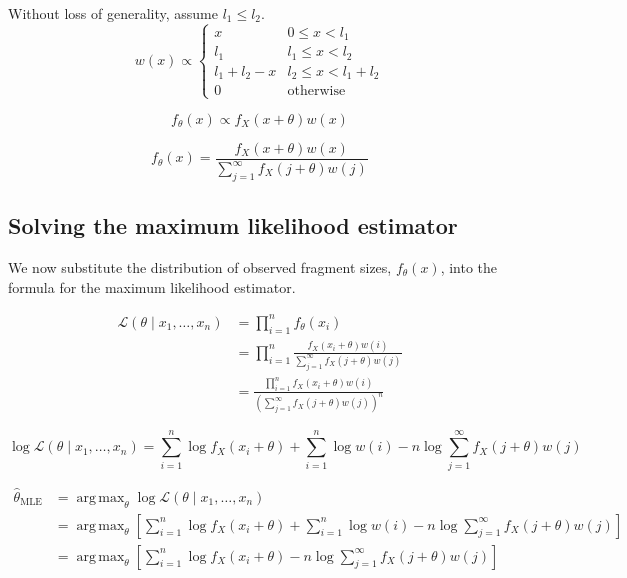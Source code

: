 \documentclass[letterpaper,12pt]{article}
\DeclareMathOperator*{\argmax}{arg\,max}
\DeclareMathOperator{\MLE}{MLE}
\begin{document}
Without loss of generality, assume $l_1 \leq l_2$.
\begin{equation*}
w(x) \propto \begin{cases}
x & 0 \leq x < l_1 \\
l_1 & l_1 \leq x < l_2 \\
l_1 + l_2 - x & l_2 \leq x < l_1 + l_2 \\
0 & \text{otherwise}
\end{cases}
\end{equation*}

\begin{equation*}
f_\theta(x) \propto f_X(x + \theta) w(x)
\end{equation*}

\begin{equation*}
f_\theta(x) = \frac{ f_X(x + \theta) w(x) }
	{ \sum_{j=1}^\infty f_X(j + \theta) w(j) }
\end{equation*}

\subsection*{Solving the maximum likelihood estimator}

We now substitute the distribution of observed fragment sizes,
$f_\theta(x)$, into the formula for the maximum likelihood estimator.

\begin{align*}
\mathcal{L}(\theta \mid x_1, \dotsc, x_n)
&= \prod_{i=1}^n f_\theta(x_i) \\
&= \prod_{i=1}^n \frac{ f_X(x_i + \theta) w(i) }
	{ \sum_{j=1}^\infty f_X(j + \theta) w(j) } \\
&= \frac{ \prod_{i=1}^n f_X(x_i + \theta) w(i) }
	{ \left( \sum_{j=1}^\infty f_X(j + \theta) w(j) \right) ^n }
\end{align*}

\begin{equation*}
\log \mathcal{L}(\theta \mid x_1, \dotsc, x_n)
= \sum_{i=1}^n \log f_X(x_i + \theta)
	+ \sum_{i=1}^n \log w(i)
	- n \log \sum_{j=1}^\infty f_X(j + \theta) w(j)
\end{equation*}

\begin{align*}
\hat \theta_{\MLE}
&= \argmax_\theta \log \mathcal{L}(\theta \mid x_1, \dotsc, x_n) \\
&= \argmax_\theta \left[ \sum_{i=1}^n \log f_X(x_i + \theta)
	+ \sum_{i=1}^n \log w(i)
	- n \log \sum_{j=1}^\infty f_X(j + \theta) w(j) \right] \\
&= \argmax_\theta \left[ \sum_{i=1}^n \log f_X(x_i + \theta)
	- n \log \sum_{j=1}^\infty f_X(j + \theta) w(j) \right]
\end{align*}
\end{document}
